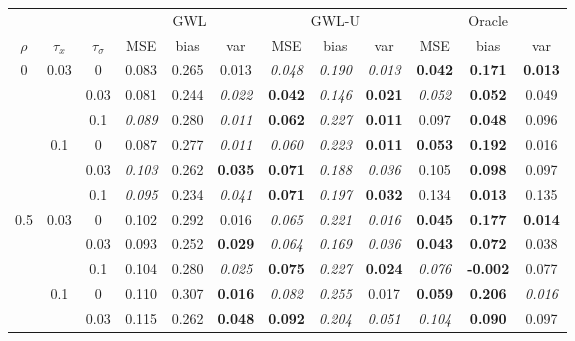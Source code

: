 \documentclass[authoryear, review, 11pt]{elsarticle}
\begin{document}
		
		\begin{table}[ht]
		\begin{center}
		\begin{tabular}{ccc | ccc | ccc | ccc }
		&&&\multicolumn{3}{c}{GWL}&\multicolumn{3}{c}{GWL-U}&\multicolumn{3}{c}{Oracle}\\
		$\rho$ & $\tau_x$ & $\tau_\sigma$ & MSE & bias & var &  MSE & bias & var &  MSE & bias & var\\   \hline
		\multirow{6}{*}{0} & \multirow{3}{*}{0.03} & 0 & 0.083 & 0.265 & 0.013 & \emph{0.048} & \emph{0.190} & \emph{0.013} & \textbf{0.042} & \textbf{0.171} & \textbf{0.013} \\ 
		 &  & 0.03 &   0.081 & 0.244 & \emph{0.022} & \textbf{0.042} & \emph{0.146} & \textbf{0.021} & \emph{0.052} & \textbf{0.052} & 0.049 \\ 
		 &  & 0.1 &   \emph{0.089} & 0.280 & \emph{0.011} & \textbf{0.062} & \emph{0.227} & \textbf{0.011} & 0.097 & \textbf{0.048} & 0.096 \\ \cline{2-12}
		 & \multirow{3}{*}{0.1} & 0 &   0.087 & 0.277 & \emph{0.011} & \emph{0.060} & \emph{0.223} & \textbf{0.011} & \textbf{0.053} & \textbf{0.192} & 0.016 \\ 
		 &  & 0.03 &   \emph{0.103} & 0.262 & \textbf{0.035} & \textbf{0.071} & \emph{0.188} & \emph{0.036} & 0.105 & \textbf{0.098} & 0.097 \\ 
		 &  & 0.1 &   \emph{0.095} & 0.234 & \emph{0.041} & \textbf{0.071} & \emph{0.197} & \textbf{0.032} & 0.134 & \textbf{0.013} & 0.135 \\ \cline{1-12}
		\multirow{6}{*}{0.5} & \multirow{3}{*}{0.03} & 0 &   0.102 & 0.292 & 0.016 & \emph{0.065} & \emph{0.221} & \emph{0.016} & \textbf{0.045} & \textbf{0.177} & \textbf{0.014} \\ 
		 &  & 0.03 &   0.093 & 0.252 & \textbf{0.029} & \emph{0.064} & \emph{0.169} & \emph{0.036} & \textbf{0.043} & \textbf{0.072} & 0.038 \\ 
		 &  & 0.1 &   0.104 & 0.280 & \emph{0.025} & \textbf{0.075} & \emph{0.227} & \textbf{0.024} & \emph{0.076} & \textbf{-0.002} & 0.077 \\ \cline{2-12}
		 & \multirow{3}{*}{0.1} & 0 &   0.110 & 0.307 & \textbf{0.016} & \emph{0.082} & \emph{0.255} & 0.017 & \textbf{0.059} & \textbf{0.206} & \emph{0.016} \\ 
		 &  & 0.03 &   0.115 & 0.262 & \textbf{0.048} & \textbf{0.092} & \emph{0.204} & \emph{0.051} & \emph{0.104} & \textbf{0.090} & 0.097 \\ 

\end{tabular}
\end{center}
\end{table}
\end{document}
